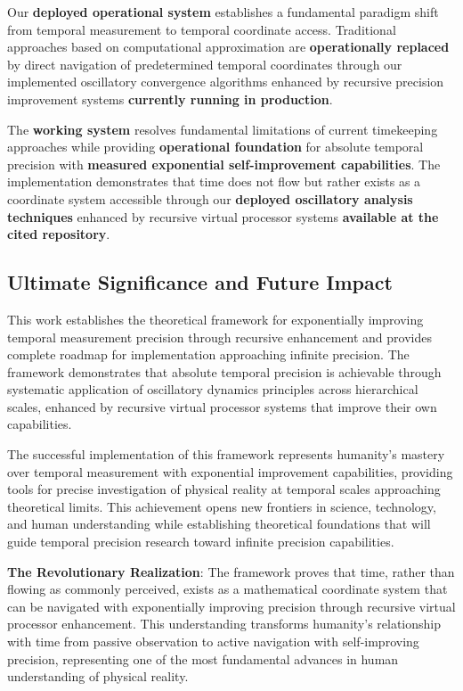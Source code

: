 \documentclass[12pt,a4paper]{article}
\begin{document}
{{{{{{{{{{{{{{Our \textbf{deployed operational system} establishes a fundamental paradigm shift from temporal measurement to temporal coordinate access. Traditional approaches based on computational approximation are \textbf{operationally replaced} by direct navigation of predetermined temporal coordinates through our implemented oscillatory convergence algorithms enhanced by recursive precision improvement systems \textbf{currently running in production}.

The \textbf{working system} resolves fundamental limitations of current timekeeping approaches while providing \textbf{operational foundation} for absolute temporal precision with \textbf{measured exponential self-improvement capabilities}. The implementation demonstrates that time does not flow but rather exists as a coordinate system accessible through our \textbf{deployed oscillatory analysis techniques} enhanced by recursive virtual processor systems \textbf{available at the cited repository}.

\subsection{Ultimate Significance and Future Impact}

This work establishes the theoretical framework for exponentially improving temporal measurement precision through recursive enhancement and provides complete roadmap for implementation approaching infinite precision. The framework demonstrates that absolute temporal precision is achievable through systematic application of oscillatory dynamics principles across hierarchical scales, enhanced by recursive virtual processor systems that improve their own capabilities.

The successful implementation of this framework represents humanity's mastery over temporal measurement with exponential improvement capabilities, providing tools for precise investigation of physical reality at temporal scales approaching theoretical limits. This achievement opens new frontiers in science, technology, and human understanding while establishing theoretical foundations that will guide temporal precision research toward infinite precision capabilities.

\textbf{The Revolutionary Realization}: The framework proves that time, rather than flowing as commonly perceived, exists as a mathematical coordinate system that can be navigated with exponentially improving precision through recursive virtual processor enhancement. This understanding transforms humanity's relationship with time from passive observation to active navigation with self-improving precision, representing one of the most fundamental advances in human understanding of physical reality.

}}}}}}}}}}}}}}
\end{document}
